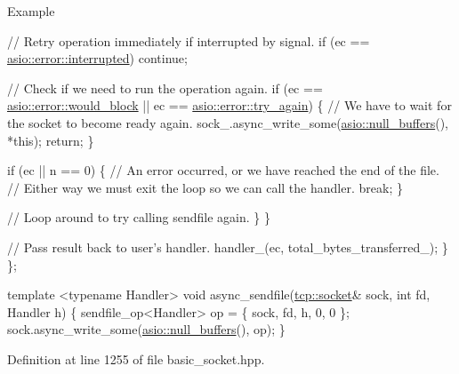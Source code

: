 \begin{DoxyParagraph}{Example}
\begin{DoxyCode}
        \textcolor{comment}{// Retry operation immediately if interrupted by signal.}
        \textcolor{keywordflow}{if} (ec == \hyperlink{namespaceasio_1_1error_a2a69445eee784059ac2f4a6c4f5fe90da949a87be73ee9cdca623f92fb27cd45c}{asio::error::interrupted})
          \textcolor{keywordflow}{continue};

        \textcolor{comment}{// Check if we need to run the operation again.}
        \textcolor{keywordflow}{if} (ec == \hyperlink{namespaceasio_1_1error_a2a69445eee784059ac2f4a6c4f5fe90da8e8ff1984495eb85ec17c37e3e5a89e5}{asio::error::would\_block}
            || ec == \hyperlink{namespaceasio_1_1error_a2a69445eee784059ac2f4a6c4f5fe90da6e9965827dc7afaba3b2b90a02b19058}{asio::error::try\_again})
        \{
          \textcolor{comment}{// We have to wait for the socket to become ready again.}
          sock\_.async\_write\_some(\hyperlink{classasio_1_1null__buffers}{asio::null\_buffers}(), *\textcolor{keyword}{this});
          \textcolor{keywordflow}{return};
        \}

        \textcolor{keywordflow}{if} (ec || n == 0)
        \{
          \textcolor{comment}{// An error occurred, or we have reached the end of the file.}
          \textcolor{comment}{// Either way we must exit the loop so we can call the handler.}
          \textcolor{keywordflow}{break};
        \}

        \textcolor{comment}{// Loop around to try calling sendfile again.}
      \}
    \}

    \textcolor{comment}{// Pass result back to user's handler.}
    handler\_(ec, total\_bytes\_transferred\_);
  \}
\};

\textcolor{keyword}{template} <\textcolor{keyword}{typename} Handler>
\textcolor{keywordtype}{void} async\_sendfile(\hyperlink{namespacewebsocketpp_1_1transport_1_1asio_1_1socket_1_1error_a828ddaa5ed63a761e1b557465a35f05aa0c31b356014843e1d09514e794a539a7}{tcp::socket}& sock, \textcolor{keywordtype}{int} fd, Handler h)
\{
  sendfile\_op<Handler> op = \{ sock, fd, h, 0, 0 \};
  sock.async\_write\_some(\hyperlink{classasio_1_1null__buffers}{asio::null\_buffers}(), op);
\} 
\end{DoxyCode}
 
\end{DoxyParagraph}


Definition at line 1255 of file basic\+\_\+socket.\+hpp.

\hypertarget{classasio_1_1basic__socket_ad1ff1c090ac8d393778f7486c92d07f6}{}
